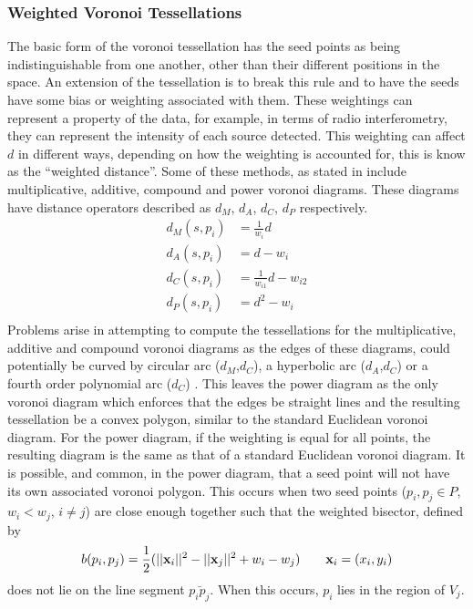 \subsubsection{Weighted Voronoi Tessellations}\label{tes:ssec:wei}
The basic form of the voronoi tessellation has the seed points as being indistinguishable from one another, other than their different positions in the space. An extension of the tessellation is to break this rule and to have the seeds have some bias or weighting associated with them. These weightings can represent a property of the data, for example, in terms of radio interferometry, they can represent the intensity of each source detected. This weighting can affect $d$ in different ways, depending on how the weighting is accounted for, this is know as the ``weighted distance''. Some of these methods, as stated in \cite{okabe2009spatial} include multiplicative, additive, compound and power voronoi diagrams. These diagrams have distance operators described as $d_M$, $d_A$, $d_C$, $d_P$ respectively.
%
\begin{equation}
\begin{align}
  d_M(s,p_i) &= \frac{1}{w_i}d			\\
  d_A(s,p_i) &= d - w_i				\\
  d_C(s,p_i) &= \frac{1}{w_{i1}}d - w_{i2}	\\
  d_P(s,p_i) &= d^2 - w_i			\\
\end{align}
\end{equation}
%
Problems arise in attempting to compute the tessellations for the multiplicative, additive and compound voronoi diagrams as the edges of these diagrams, could potentially be curved by circular arc ($d_M$,$d_C$), a hyperbolic arc ($d_A$,$d_C$) or a fourth order polynomial arc ($d_C$) \citep{okabe2009spatial}. This leaves the power diagram as the only voronoi diagram which enforces that the edges be straight lines and the resulting tessellation be a convex polygon, similar to the standard Euclidean voronoi diagram. For the power diagram, if the weighting is equal for all points, the resulting diagram is the same as that of a standard Euclidean voronoi diagram. It is possible, and common, in the power diagram, that a seed point will not have its own associated voronoi polygon. This occurs when two seed points ($p_i,p_j \in P$, $w_i<w_j$, $i\neq j$) are close enough together such that the weighted bisector, defined by 
%
\begin{equation}
 b(p_i,p_j) = \frac{1}{2}(||\bold{x}_i||^2-||\bold{x}_j||^2+w_i-w_j) \qquad \bold{x}_i = (x_i,y_i)
\end{equation}
%
does not lie on the line segment $\bar{p_ip_j}$. When this occurs, $p_i$ lies in the region of $V_j$.
%
